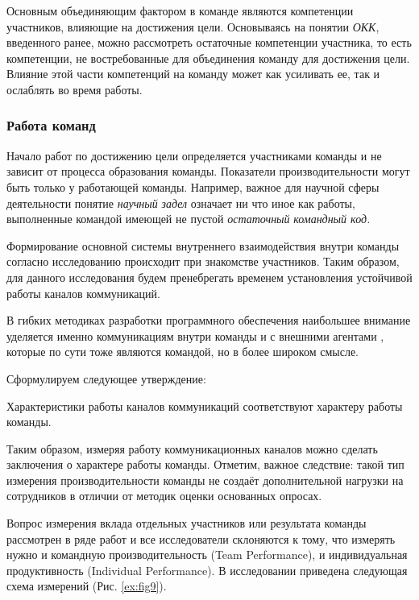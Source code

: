 Основным объединяющим фактором в команде являются компетенции участников, влияющие на достижения цели.
Основываясь на понятии \emph{ОКК}, введенного ранее, можно рассмотреть остаточные компетенции участника, то есть компетенции, не востребованные для объединения команду для достижения цели. 
Влияние этой части компетенций на команду может как усиливать ее, так и ослаблять во время работы.

\subsubsection{Работа команд}

Начало работ по достижению цели определяется участниками команды и не зависит от процесса образования команды. 
Показатели производительности могут быть только у работающей команды. 
Например, важное для научной сферы деятельности понятие \emph{научный} \emph{задел} означает ни что иное как работы, выполненные командой имеющей не пустой \emph{остаточный} \emph{командный код.}

Формирование основной системы внутреннего взаимодействия внутри команды согласно исследованию \cite{harper1985power} происходит при знакомстве участников.
Таким образом, для данного исследования будем пренебрегать временем установления устойчивой работы каналов коммуникаций.

В гибких методиках разработки программного обеспечения наибольшее внимание уделяется именно коммуникациям внутри команды \cite{boehm2003people} и с внешними агентами \cite{paasivaara2012experiences}, которые по сути тоже являются командой, но в более широком смысле.

Сформулируем следующее утверждение:

\begin{state} \label{state:4}
Характеристики работы каналов коммуникаций соответствуют характеру работы команды.
\end{state}

Таким образом, измеряя работу коммуникационных каналов можно сделать заключения о характере работы команды.
Отметим, важное следствие: такой тип измерения производительности команды не создаёт дополнительной нагрузки на сотрудников в отличии от методик оценки основанных опросах.

Вопрос измерения вклада отдельных участников или результата команды рассмотрен в ряде работ \cite{tannenbaum2013team,hill1982group} и все исследователи склоняются к тому, что измерять нужно и командную производительность (Team Performance), и индивидуальная продуктивность (Individual Performance).
В исследовании \cite{tims2013job} приведена следующая схема измерений (Рис. \ref{ex:fig9}).

